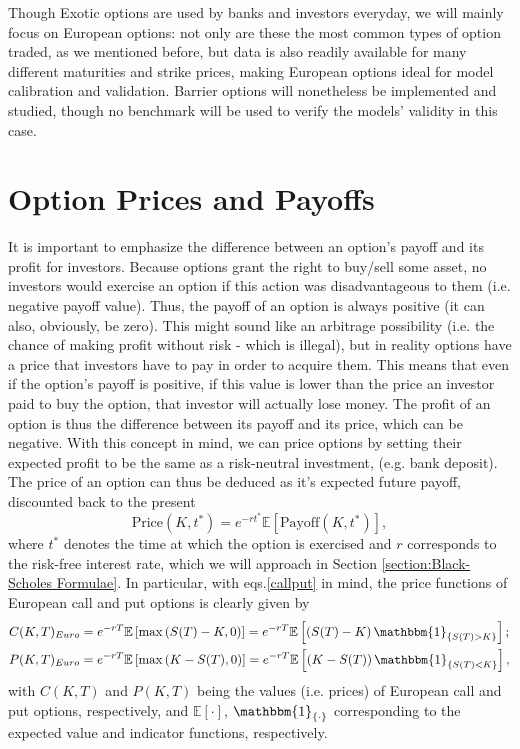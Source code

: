 Though Exotic options are used by banks and investors everyday, we will mainly focus on European options: not only are these the most common types of option traded, as we mentioned before, but data is also readily available for many different maturities and strike prices, making European options ideal for model calibration and validation.
Barrier options will nonetheless be implemented and studied, though no benchmark will be used to verify the models' validity in this case.


\section{Option Prices and Payoffs}
It is important to emphasize the difference between an option's payoff and its profit for investors. Because options grant the right to buy/sell some asset, no investors would exercise an option if this action was disadvantageous to them (i.e. negative payoff value). Thus, the payoff of an option is always positive (it can also, obviously, be zero). This might sound like an arbitrage possibility (i.e. the chance of making profit without risk - which is illegal), but in reality options have a price that investors have to pay in order to acquire them. This means that even if the option's payoff is positive, if this value is lower than the price an investor paid to buy the option, that investor will actually lose money. The profit of an option is thus the difference between its payoff and its price, which can be negative.
With this concept in mind, we can price options by setting their expected profit to be the same as a risk-neutral investment, (e.g. bank deposit). The price of an option can thus be deduced as it's expected future payoff, discounted back to the present
\begin{equation}
\text{Price}(K,t^*)=e^{-rt^*}\mathbb{E}\left[\text{Payoff}(K,t^*)\right],
\end{equation}
\noindent where $t^*$ denotes the time at which the option is exercised and $r$ corresponds to the risk-free interest rate, which we will approach in Section \ref{section:Black-Scholes Formulae}.
In particular, with eqs.\eqref{callput} in mind, the price functions of European call and put options is clearly given by
\begin{equation}\label{callprice}
\begin{split}
&C(K,T)_{Euro}=e^{-rT}\mathbb{E}\left[\max\left(S(T)-K,0\right)\right]=e^{-rT}\mathbb{E}\left[\left(S(T)-K\right)\mathbbm{1}_{\left\{S(T)>K\right\}}\right];\\
&P(K,T)_{Euro}=e^{-rT}\mathbb{E}\left[\max\left(K-S(T),0\right)\right]=e^{-rT}\mathbb{E}\left[\left(K-S(T)\right)\mathbbm{1}_{\left\{S(T)<K\right\}}\right],
\end{split}
\end{equation}
\noindent with $C(K,T)$ and $P(K,T)$ being the values (i.e. prices) of European call and put options, respectively, and $\mathbb{E}[\cdot]$, $\mathbbm{1}_{\{\cdot\}}$ corresponding to the expected value and indicator functions, respectively.

